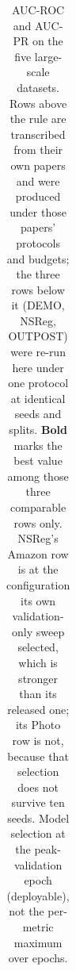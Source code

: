 \begin{table}[t]
\begin{tabular}{lcccccccccc}
\bottomrule
\end{tabular}
\caption{AUC-ROC and AUC-PR on the five large-scale datasets. Rows above the rule are transcribed from their own papers and were produced under those papers' protocols and budgets; the three rows below it (DEMO, NSReg, OUTPOST) were re-run here under one protocol at identical seeds and splits. \textbf{Bold} marks the best value among those three comparable rows only. NSReg's Amazon row is at the configuration its own validation-only sweep selected, which is stronger than its released one; its Photo row is not, because that selection does not survive ten seeds. Model selection at the peak-validation epoch (deployable), not the per-metric maximum over epochs.}
\label{tab:table2_large_valsel}
\end{table}